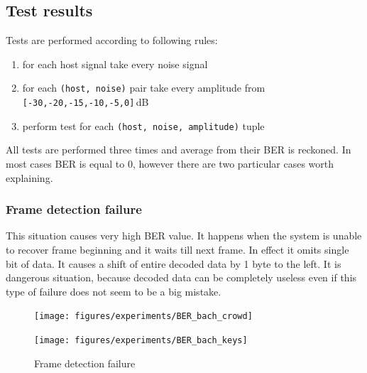 \subsection{Test results}
Tests are performed according to following rules:
\begin{enumerate}
  \item for each host signal take every noise signal
  \item for each \verb|(host, noise)| pair take every amplitude from \verb|[-30,-20,-15,-10,-5,0]|\,\mbox{dB}
  \item perform test for each \verb|(host, noise, amplitude)| tuple
\end{enumerate}
All tests are performed three times and average from their BER is reckoned. In most cases BER is equal to 0, however there
are two particular cases worth explaining.

\subsubsection{Frame detection failure}
\label{subsub:frame-detection}
This situation causes very high BER value. It happens when the system is unable to recover frame beginning and it waits till next frame.
In effect it omits single bit of data. It causes a shift of entire decoded data by 1 byte to the left. It is dangerous situation, because decoded data
can be completely useless even if this type of failure does not seem to be a big mistake.
\begin{figure}[hb]
\begin{minipage}[b]{0.45\textwidth}
  \texttt{[image: figures/experiments/BER\_bach\_crowd]}
\end{minipage}\hfill
\begin{minipage}[b]{0.45\textwidth}
  \texttt{[image: figures/experiments/BER\_bach\_keys]}
\end{minipage}\hfill
\label{fig:frame-failure}
\caption{Frame detection failure}
\end{figure}

\clearpage

